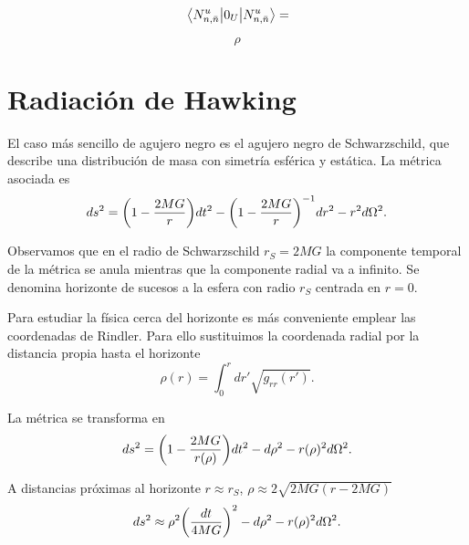 \begin{equation}
  \ev{0_U}{N^u_{n,\bar n}} =
\end{equation}

\begin{equation}
  \rho 
\end{equation}

\section{Radiación de Hawking}










El caso más sencillo de agujero negro es el agujero negro de Schwarzschild, que
describe una distribución de masa con simetría esférica y estática. La métrica asociada
es 
\begin{equation}
  ds^2= \qty(1-\frac{2MG}{r})dt^2-\qty(1-\frac{2MG}{r})^{-1}dr^2-r^2d\Omega^2.
\end{equation}

Observamos que en el radio de Schwarzschild $r_S=2MG$ la componente temporal de la 
métrica se anula mientras que la componente radial va a infinito.
Se denomina horizonte de sucesos a la esfera con radio $r_S$ centrada en $r=0$.

Para estudiar la física cerca del horizonte es más conveniente emplear las coordenadas
de Rindler. Para ello sustituimos la coordenada radial por la distancia propia hasta
el horizonte
\begin{equation}
  \rho(r)=\int_0^r dr' \sqrt{g_{rr}(r')}.
\end{equation}

La métrica se transforma en 
\begin{equation}
  ds^2=\qty(1-\frac{2MG}{r(\rho)})dt^2-d\rho^2-r(\rho)^2d\Omega^2.
\end{equation}

A distancias próximas al horizonte $r\approx r_S$, $\rho\approx 2\sqrt{2MG(r-2MG)}$
\begin{equation}
  ds^2\approx \rho^2\qty(\frac{dt}{4MG})^2 -d\rho^2-r(\rho)^2d\Omega^2.
\end{equation}

